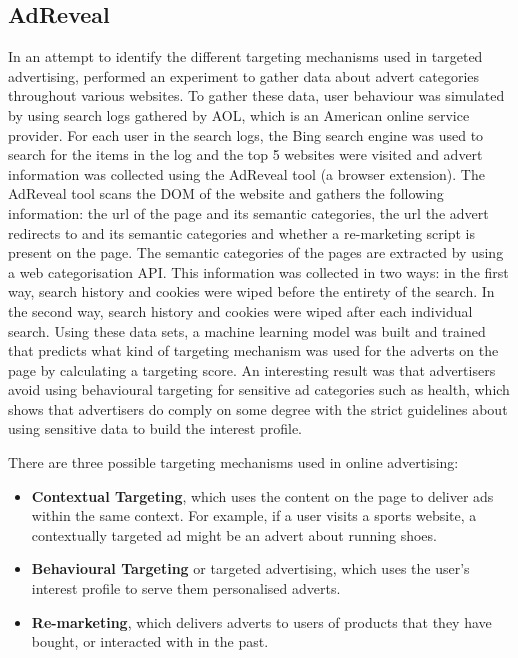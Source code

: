 \documentclass{l4proj}
\begin{document}
\subsection{AdReveal}
In an attempt to identify the different targeting mechanisms used in targeted advertising, \cite{Liu2013} performed an experiment to gather data about advert categories throughout various websites. To gather these data, user behaviour was simulated by using search logs gathered by AOL, which is an American online service provider. 
For each user in the search logs, the Bing search engine was used to search for the items in the log and the top 5 websites were visited and advert information was collected using the AdReveal tool (a browser extension). The AdReveal tool scans the DOM of the website and gathers the following information: the url of the page and its semantic categories, the url the advert redirects to and its semantic categories and whether a re-marketing script is present on the page. The semantic categories of the pages are extracted by using a web categorisation API. 
This information was collected in two ways: in the first way, search history and cookies were wiped before the entirety of the search. In the second way, search history and cookies were wiped after each individual search. Using these data sets, a machine learning model was built and trained that predicts what kind of targeting mechanism was used for the adverts on the page by calculating a targeting score. An interesting result was that advertisers avoid using behavioural targeting for sensitive ad categories such as health, which shows that advertisers do comply on some degree with the strict guidelines about using sensitive data to build the interest profile.

There are three possible targeting mechanisms used in online advertising:
\begin{itemize}
    \item \textbf{Contextual Targeting}, which uses the content on the page to deliver ads within the same context. For example, if a user visits a sports website, a contextually targeted ad might be an advert about running shoes.
    \item \textbf{Behavioural Targeting} or targeted advertising, which uses the user's interest profile to serve them personalised adverts.
    \item \textbf{Re-marketing}, which delivers adverts to users of products that they have bought, or interacted with in the past.
\end{itemize}
\end{document}
